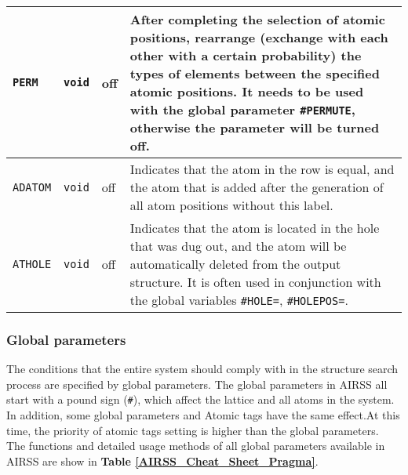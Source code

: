 \documentclass[a4paper, 10pt]{article}
\begin{document}
\begin{center}
\begin{longtable}{m{10em}|m{4em}<{\centering}|m{3em}<{\centering}|m{15em}}
\midrule
\verb|PERM| & \verb|void| & off & After completing the selection of atomic positions, rearrange (exchange with each other with a certain probability) the types of elements between the specified atomic positions. It needs to be used with the global parameter \verb|#PERMUTE|, otherwise the parameter will be turned off.\\
\midrule
\verb|ADATOM| & \verb|void| & off & Indicates that the atom in the row is equal, and the atom that is added after the generation of all atom positions without this label.\\
\midrule
\verb|ATHOLE| & \verb|void| & off & Indicates that the atom is located in the hole that was dug out, and the atom will be automatically deleted from the output structure. It is often used in conjunction with the global variables \verb|#HOLE=|, \verb|#HOLEPOS=|.\\
\bottomrule
\end{longtable}
\end{center}

\subsubsection{Global parameters}

The conditions that the entire system should comply with in the structure search process are specified by global parameters. The global parameters in AIRSS all start with a pound sign (\verb|#|), which affect the lattice and all atoms in the system. In addition, some global parameters and Atomic tags have the same effect.At this time, the priority of atomic tags setting is higher than the global parameters.\\

The functions and detailed usage methods of all global parameters available in AIRSS are show in \textbf{Table \ref{AIRSS_Cheat_Sheet_Pragma}}.
\end{document}

